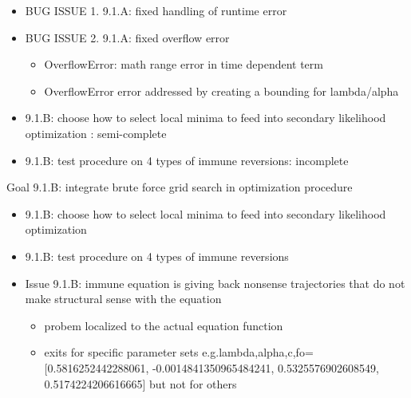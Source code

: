 \documentclass[letterpaper,index=totoc,hyperref,openany]{labbook} %
\begin{document}
\begin{itemize}

\item{BUG ISSUE 1. 9.1.A: fixed handling of runtime error}
	\begin{itemize}
        \item{ID Error:RuntimeError "Optimal parameters not found"
        \item{wrote error handling exception for when optimizer fails to converge}
 	 \end{itemize}

\item{BUG ISSUE 2. 9.1.A: fixed overflow error}
	\begin{itemize}
    	\item{OverflowError: math range error in time dependent term}
	    \item{OverflowError error addressed by creating a bounding for lambda/alpha}
    \end{itemize}
    
\item{9.1.B: choose how to select local minima to feed into secondary likelihood optimization : semi-complete}

\item{9.1.B: test procedure on 4 types of immune reversions: incomplete}

\end{itemize}




Goal 9.1.B: integrate brute force grid search in optimization procedure

\begin{itemize}

\item{9.1.B: choose how to select local minima to feed into secondary likelihood optimization}
\item{9.1.B: test procedure on 4 types of immune reversions}
\item{Issue 9.1.B: immune equation is giving back nonsense trajectories that do not make structural sense with the equation}
	\begin{itemize}
	    \item{probem localized to the actual equation function}
	    \item{exits for specific parameter sets e.g.lambda,alpha,c,fo=[0.5816252442288061,
	     -0.0014841350965484241,
 	    0.5325576902608549,
 	    0.5174224206616665] but not for others}
	\end{itemize}

\end{itemize}
\end{document}
